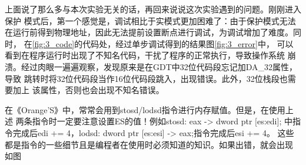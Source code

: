\documentclass[12pt,a4paper,UTF8]{ctexart}
\begin{document}
上面说了那么多与本次实验无关的话，再回来说说这次实验遇到的问题。刚刚进入保护
模式后，第一个感觉是，调试相比于实模式更加困难了：由于保护模式无法
在运行前得到物理地址，因此无法提前设置断点进行调试，为调试增加了难度。同时，
在\ref{fig:3_code}的代码处，经过单步调试得到的结果图\ref{fig:3_error}中，
可以看到在程序运行时出现了不知名代码，干扰了程序的正常执行，导致操作系统
崩溃。经过肉眼一遍遍观察，发现原来是在GDT中32位代码段忘记加DA_32属性，导致
跳转时将32位代码段当作16位代码段跳入，出现错误。此外，32位栈段也需要加上
该属性，否则也会出现不知名错误。

\begin{figure}[htbp]
\centering
{}
\end{figure}

在《Orange'S》中，常常会用到stosd/lodsd指令进行内存赋值。但是，在使用上述
两条指令时一定要注意设置ES的值！例如stosd: eax -> dword  ptr [es:edi];
中指令完成后edi += 4，lodsd: dword ptr [es:esi] -> eax;指令完成后esi += 4。
这些都是指令的一些细节且是编程者在使用时必须知道的知识。如果出错，就会出现
如图
\end{document}
